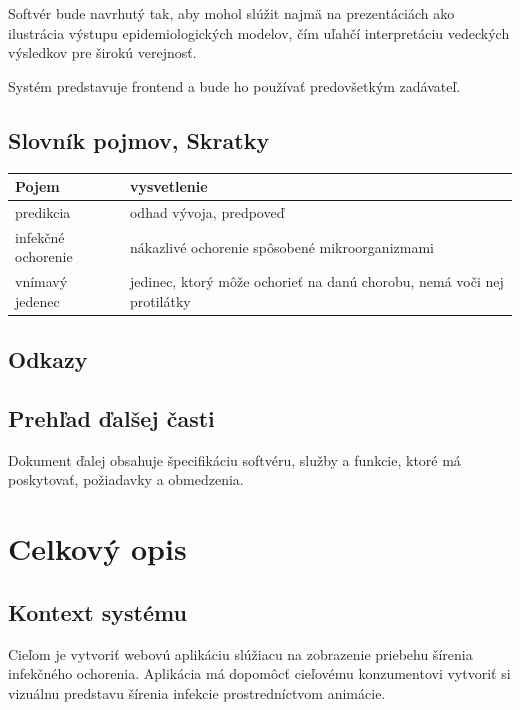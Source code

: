 \documentclass[12pt,a4paper]{report}
\begin{document}
Softvér bude navrhutý tak, aby mohol slúžit najmä na prezentáciách ako ilustrácia výstupu epidemiologických modelov, čím uľahčí interpretáciu vedeckých výsledkov pre širokú verejnosť.\par

Systém predstavuje frontend a bude ho používať predovšetkým zadávateľ.
\pagebreak
\section[Slovník pojmov, Skratky]{\rmfamily\bfseries
	Slovník pojmov, Skratky}	
\begin{table}[h!]
	\centering
	\begin{tabular}{|>{\centering\arraybackslash}m{2in}|>{\centering\arraybackslash}m{1in}|}
		\hline
		\centering Pojem & vysvetlenie \\ [0ex]
		\hline
		predikcia & odhad vývoja, predpoveď \\ [0ex]
		\hline
		infekčné ochorenie & nákazlivé ochorenie spôsobené mikroorganizmami \\ [0ex]
		\hline
		vnímavý jedenec & jedinec, ktorý môže ochorieť na danú chorobu, nemá voči nej protilátky \\ [0ex]
		\hline
	\end{tabular}
\end{table}

\section[Odkazy]{\rmfamily\bfseries
	Odkazy}

\section[Prehľad ďalšej časti]{\rmfamily\bfseries
	Prehľad ďalšej časti}
Dokument ďalej obsahuje špecifikáciu softvéru, služby a funkcie, ktoré má poskytovať, požiadavky a obmedzenia. 

\renewcommand{\chaptername}{}	
\chapter[Celkový opis]{\rmfamily\bfseries
	Celkový opis}

\section[Kontext systému]{\rmfamily\bfseries
	Kontext systému}
Cieľom je vytvoriť webovú aplikáciu slúžiacu na zobrazenie priebehu šírenia infekčného ochorenia. Aplikácia má dopomôcť cieľovému konzumentovi vytvoriť si vizuálnu predstavu šírenia infekcie prostredníctvom animácie.
\end{document}
